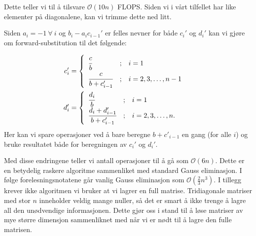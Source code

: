 \documentclass[11pt]{article}
\numberwithin{figure}{section} %
\numberwithin{table}{section} %
\begin{document}
Dette teller vi til å tilsvare $\mathcal{O}(10n)$ FLOPS. Siden vi i
vårt tilfellet har like elementer på diagonalene, kan vi trimme dette
ned litt. 

Siden $a_i = -1\ \forall\  i$ og  $b_i - a_ic_{i-1}'$ er felles nevner
for både $c_i'$ og $d_i'$ kan vi gjøre om forward-substitution til det følgende:

\begin{align*}
  c_i' &= \begin{cases}
\begin{array}{lcl}
  \cfrac{c}{b}                  & ; & i = 1 \\
  \cfrac{c}{b + c'_{i - 1}} & ; & i = 2, 3, \dots, n-1 \\
\end{array}
\end{cases}\\
d_i' &= \begin{cases}
\begin{array}{lcl}
  \cfrac{d_i}{b}                  & ; & i = 1 \\
  \cfrac{d_i + d'_{i - 1}}{b + c'_{i - 1}} & ; & i = 2, 3, \dots, n. \\
\end{array}
\end{cases}
\end{align*}
Her kan vi spare operasjoner ved å bare beregne $b+c'_{i-1}$ en gang
(for alle $i$) og bruke resultatet både for beregningen av $c_{i}'$ og
$d_{i}'$.

Med disse endringene teller vi antall operasjoner til å gå som
$\mathcal{O}(6n)$. Dette er en betydelig raskere algoritme sammenliket
med standard Gauss eliminasjon. I følge forelesningsnotatene går
vanlig Gauss eliminasjon som $\mathcal{O}(\frac{ 2 }{ 3 }n^3)$. I
tillegg krever ikke algoritmen vi bruker at vi lagrer en full
matrise. Tridiagonale matriser med stor $n$ inneholder veldig mange
nuller, så det er smart å ikke trenge å lagre all den unødvendige
informasjonen. Dette gjør oss i stand til å løse matriser av mye
større dimensjon sammenliknet med når vi er nødt til å lagre den fulle matrisen.
\end{document}
